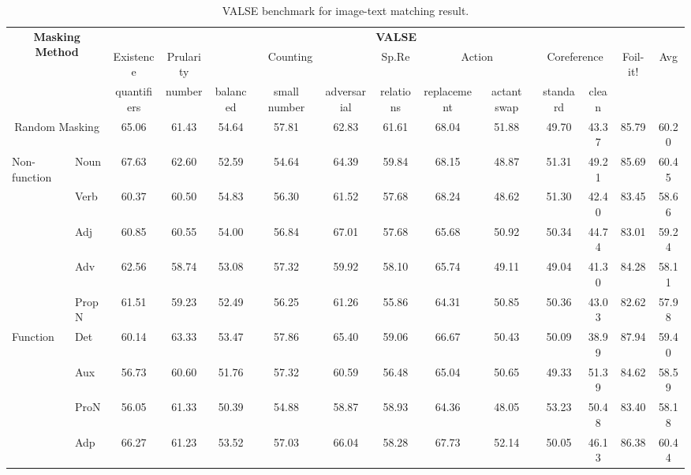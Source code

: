 \begin{table}[]
    \centering
    \caption{VALSE benchmark for image-text matching result.}
    \label{tab:valse}
    \begin{adjustbox}{width=1\textwidth}
        \begin{tabular}{ll|c|c|ccc|c|cc|cc|c|c}
            \hline
            \multicolumn{2}{c|}{\multirow{3}{*}{\textbf{Masking Method}}} & \multicolumn{12}{c}{\textbf{VALSE}} \\
            & & Existence & Prularity & \multicolumn{3}{c|}{Counting} & Sp.Re \footnotemark & \multicolumn{2}{c|}{Action} & \multicolumn{2}{c|}{Coreference} & \multirow{2}{*}{Foil-it!} & \multirow{2}{*}{Avg} \\
            & & quantifiers & number & balanced & small number & adversarial & relations & replacement & actant swap & standard & clean & & \\
            \hline
            \multicolumn{2}{c|}{Random Masking} & 65.06 & 61.43 & \cellcolor{green}54.64 & 57.81 & 62.83 & \cellcolor{green}61.61 & 68.04 & 51.88 & 49.70 & 43.37 & 85.79 & 60.20 \\
            \hline
            \multirow{5}{*}{Non-function} & Noun & \cellcolor{green}67.63 & 62.60 & 52.59 & 54.64 & 64.39 & 59.84 & 68.15 & 48.87 & 51.31 & 49.21 & 85.69 & \cellcolor{green}60.45 \\
            & Verb & 60.37 & 60.50 & 54.83 & 56.30 & 61.52 & 57.68 & \cellcolor{green}68.24 & 48.62 & 51.30 & 42.40 & 83.45 & 58.66 \\
            & Adj & 60.85 & 60.55 & 54.00 & 56.84 & \cellcolor{green}67.01 & 57.68 & 65.68 & 50.92 & 50.34 & 44.74 & 83.01 & 59.24 \\
            & Adv & 62.56 & 58.74 & 53.08 & 57.32 & 59.92 & 58.10 & 65.74 & 49.11 & 49.04 & 41.30 & 84.28 & 58.11 \\
            & PropN & 61.51 & 59.23 & 52.49 & 56.25 & 61.26 & 55.86 & 64.31 & 50.85 & 50.36 & 43.03 & 82.62 & 57.98 \\
            \hline
            \multirow{4}{*}{Function} & Det & 60.14 & \cellcolor{green}63.33 & 53.47 & \cellcolor{green}57.86 & 65.40 & 59.06 & 66.67 & 50.43 & 50.09 & 38.99 & \cellcolor{green}87.94 & 59.40 \\
            & Aux & 56.73 & 60.60 & 51.76 & 57.32 & 60.59 & 56.48 & 65.04 & 50.65 & 49.33 & \cellcolor{green}51.39 & 84.62 & 58.59 \\
            & ProN & 56.05 & 61.33 & 50.39 & 54.88 & 58.87 & 58.93 & 64.36 & 48.05 & \cellcolor{green}53.23 & 50.48 & 83.40 & 58.18 \\
            & Adp & 66.27 & 61.23 & 53.52 & 57.03 & 66.04 & 58.28 & 67.73 & \cellcolor{green}52.14 & 50.05 & 46.13 & 86.38 & 60.44 \\
            \hline
        \end{tabular}
    \end{adjustbox}
\end{table}

